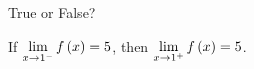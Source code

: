 \documentclass{ximera}
\author{Gregory Hartman \and Matthew Carr}
\begin{document}
\begin{exercise}



True or False?
\begin{center}
If $\lim_{x\to1^{-}}f\p{x}=5$, then $\lim_{x\to1^{+}}f\p{x}=5$.
\end{center}

\begin{prompt}
\begin{multipleChoice}
\end{multipleChoice}
\end{prompt}

\end{exercise}
\end{document}

